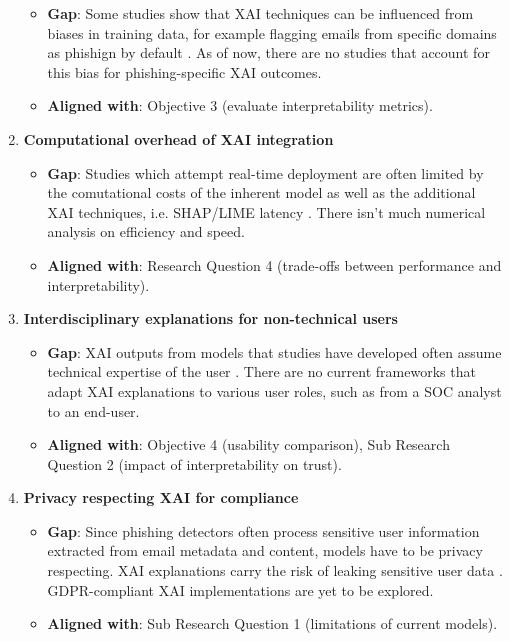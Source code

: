 \begin{enumerate}
\begin{itemize}
      \item \textbf{Gap}: Some studies show that XAI techniques can be influenced from biases in training data, for example flagging emails from specific domains as phishign by default \citep{hanif2021survey}. As of now, there are no studies that account for this bias for phishing-specific XAI outcomes.
    \item \textbf{Aligned with}: Objective 3 (evaluate interpretability metrics).
  \end{itemize}
  \item \textbf{Computational overhead of XAI integration}
  \begin{itemize}
    \item \textbf{Gap}: Studies which attempt real-time deployment are often limited by the comutational costs of the inherent model as well as the additional XAI techniques, i.e. SHAP/LIME latency \citep{kapoor2024comparative}. There isn't much numerical analysis on efficiency and speed.
    \item \textbf{Aligned with}: Research Question 4 (trade-offs between performance and interpretability).
  \end{itemize}
  \item \textbf{Interdisciplinary explanations for non-technical users} 
  \begin{itemize}
    \item \textbf{Gap}: XAI outputs from models that studies have developed often assume technical expertise of the user \citep{greco2023explaining}. There are no current frameworks that adapt XAI explanations to various user roles, such as from a SOC analyst to an end-user.
    \item \textbf{Aligned with}: Objective 4 (usability comparison), Sub Research Question 2 (impact of interpretability on trust). 
  \end{itemize}
  \item \textbf{Privacy respecting XAI for compliance}
  \begin{itemize}
    \item \textbf{Gap}: Since phishing detectors often process sensitive user information extracted from email metadata and content, models have to be privacy respecting. XAI explanations carry the risk of leaking sensitive user data \citep{atlam2022business}. GDPR-compliant XAI implementations are yet to be explored.
    \item \textbf{Aligned with}: Sub Research Question 1 (limitations of current models).
  \end{itemize}
\end{enumerate}

